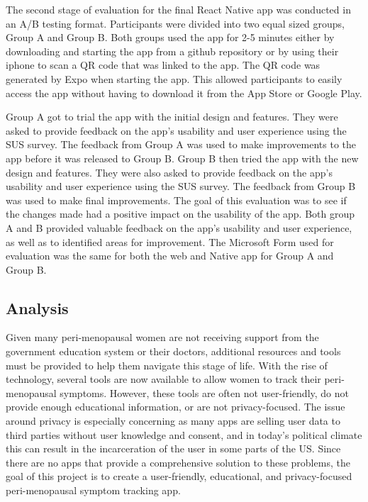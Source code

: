 The second stage of evaluation for the final React Native app was conducted in an A/B testing format. Participants were divided into two equal sized groups, Group A and Group B. 
Both groups used the app for 2-5 minutes either by downloading and starting the app from a github repository or by using their iphone to scan a QR code that was linked to the app. The QR code was generated by Expo when starting the app. This allowed participants to easily access the app without having to download it from the App Store or Google Play. 

Group A got to trial the app with the initial design and features. They were asked to provide feedback on the app's usability and user experience using the SUS survey. The feedback from Group A was used to make improvements to the app before it was released to Group B. Group B then tried the app with the new design and features. They were also asked to provide feedback on the app's usability and user experience using the SUS survey. The feedback from Group B was used to make final improvements. The goal of this evaluation was to see if the changes made had a positive impact on the usability of the app. Both group A and B provided valuable feedback on the app's usability and user experience, as well as to identified areas for improvement. The Microsoft Form used for evaluation was the same for both the web and Native app for Group A and Group B. 
 
\subsection{Analysis}
Given many peri-menopausal women are not receiving support from the government education system or their doctors\cite{Aljumah2023}\cite{MenopauseSupport2021}\cite{UCL2023}, additional resources and tools must be provided to help them navigate this stage of life. With the rise of technology, several tools are now available to allow women to track their peri-menopausal symptoms. However, these tools are often not user-friendly, do not provide enough educational information, or are not privacy-focused. The issue around privacy is especially concerning as many apps are selling user data to third parties without user knowledge and consent, and in today's political climate this can result in the incarceration of the user in some parts of the US\cite{Kelly2023}. Since there are no apps that provide a comprehensive solution to these problems, the goal of this project is to create a user-friendly, educational, and privacy-focused peri-menopausal symptom tracking app.

